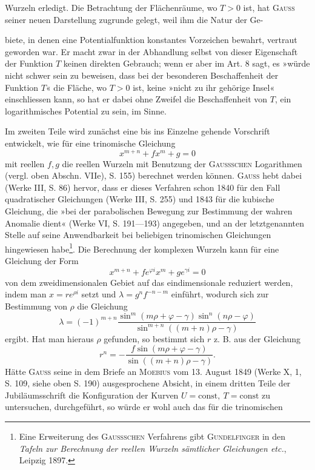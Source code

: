 Wurzeln erledigt. Die Betrachtung der Flächenräume, wo \(T>0\) ist, hat
\textsc{Gauss} seiner neuen Darstellung zugrunde gelegt, weil ihm die Natur der Ge-\par
\clearpage{}
\noindent biete, in denen eine Potentialfunktion konstantes Vorzeichen bewahrt, vertraut
geworden war. Er macht zwar in der Abhandlung selbst von dieser Eigenschaft
der Funktion \(T\) keinen direkten Gebrauch; wenn er aber im Art. 8
sagt, es »würde nicht schwer sein zu beweisen, dass bei der besonderen Beschaffenheit
der Funktion \(T\)« die Fläche, wo \(T>0\) ist, keine »nicht zu ihr
gehörige Insel« einschliessen kann, so hat er dabei ohne Zweifel die Beschaffenheit
von \(T\), ein logarithmisches Potential zu sein, im Sinne.
\par
Im zweiten Teile wird zunächst eine bis ins Einzelne gehende Vorschrift
entwickelt, wie für eine trinomische Gleichung
\[
x^{m+n}+fx^m+g=0
\]
mit reellen \(f,g\) die reellen Wurzeln mit Benutzung der \textsc{Gaussschen} Logarithmen
(vergl. oben Abschn. VIIe), S. 155) berechnet werden können. \textsc{Gauss}
hebt dabei (Werke III, S. 86) hervor, dass er dieses Verfahren schon 1840
für den Fall quadratischer Gleichungen (Werke III, S. 255) und 1843 für die
kubische Gleichung, die »bei der parabolischen Bewegung zur Bestimmung
der wahren Anomalie dient« (Werke VI, S. 191—193) angegeben, und an der
letztgenannten Stelle auf seine Anwendbarkeit bei beliebigen trinomischen
Gleichungen hingewiesen habe\footnote{Eine Erweiterung des \textsc{Gaussschen} Verfahrens gibt \textsc{Gundelfinger} in den \textit{Tafeln zur Berechnung der reellen Wurzeln sämtlicher Gleichungen etc.}, Leipzig 1897.}. Die Berechnung der komplexen Wurzeln
kann für eine Gleichung der Form
\[
x^{m+n}+fe^{\varphi i}x^m+ge^{\gamma i}=0
\]
von dem zweidimensionalen Gebiet auf das eindimensionale reduziert werden,
indem man \(x=re^{\rho i}\) setzt und \(\lambda=g^nf^{-n-m}\) einführt, wodurch sich zur Bestimmung
von \(\rho\) die Gleichung
\[
\lambda=(-1)^{m+n}\frac{\sin^m(m\rho+\varphi-\gamma)\sin^n(n\rho-\varphi)}{\sin^{m+n}((m+n)\rho-\gamma)}
\]
ergibt. Hat man hieraus \(\rho\) gefunden, so bestimmt sich \(r\) z. B. aus der Gleichung
\[
r^n=-\frac{f\sin(m\rho+\varphi-\gamma)}{\sin((m+n)\rho-\gamma)}.
\]
Hätte \textsc{Gauss} seine in dem Briefe an \textsc{Moebius} vom 13. August 1849 (Werke
X, 1, S. 109, siehe oben S. 190) ausgesprochene Absicht, in einem dritten
Teile der Jubiläumsschrift die Konfiguration der Kurven \(U=\mathrm{const},\ T=\mathrm{const}\)
zu untersuchen, durchgeführt, so würde er wohl auch das für die trinomischen\par
